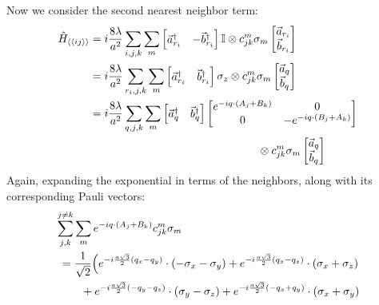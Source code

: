 \documentclass[10pt,a4paper]{article}
\begin{document}
\begin{multicols}{2}
Now we consider the second nearest neighbor term:
\tiny
\begin{align*}
\hat{H}_{\scriptsize\langle\langle ij\rangle\rangle}& = i\frac{8\lambda}{a^2}\sum_{i,j,k}\sum_{m}\begin{bmatrix} \vec{a}_{r_i}^{\dagger} & -\vec{b}_{r_i}^{\dagger} \end{bmatrix}\mathbb{I}\otimes c^m_{jk}\sigma_m \begin{bmatrix} \vec{a}_{r_i} \\ \vec{b}_{r_i}\end{bmatrix}\\
&=  i\frac{8\lambda}{a^2}\sum_{r_i,j,k}\sum_{m}\begin{bmatrix} \vec{a}_{r_i}^{\dagger} & \vec{b}_{r_i}^{\dagger} \end{bmatrix}\sigma_z\otimes c^m_{jk}\sigma_m \begin{bmatrix} \vec{a}_{q} \\ \vec{b}_{q}\end{bmatrix}\\
&=  i\frac{8\lambda}{a^2}\sum_{q,j,k}\sum_{m}\begin{bmatrix} \vec{a}_{q}^{\dagger} & \vec{b}_{q}^{\dagger} \end{bmatrix}\begin{bmatrix} e^{-iq\cdot (A_j+B_k)}&0\\0& -e^{-iq\cdot (B_j+A_k)}\\ \end{bmatrix}\\
&\hspace{5.3cm}\otimes c^m_{jk}\sigma_m \begin{bmatrix} \vec{a}_{q} \\ \vec{b}_{q}\end{bmatrix}\\
\end{align*}\normalsize
Again, expanding the exponential in terms of the neighbors, along with its corresponding Pauli vectors:
\tiny
\begin{align*}
&\sum_{j,k}^{j\neq k}\sum_{m}e^{-iq\cdot (A_j+B_k)}c_{jk}^{m}\sigma_m\\
& \ = \frac{1}{\sqrt{2}} \Big( e^{-i\frac{a\sqrt{3}}{2}(q_x-q_y)}\cdot (-\sigma_x - \sigma_y)+e^{-i\frac{a\sqrt{3}}{2}(q_x-q_z)}\cdot (\sigma_x + \sigma_z)\\
&\hspace{0.8cm} + e^{-i\frac{a\sqrt{3}}{2}(-q_y-q_z)}\cdot (\sigma_y - \sigma_z)+ e^{-i\frac{a\sqrt{3}}{2}(-q_x+q_y)}\cdot (\sigma_x + \sigma_y)\\

\end{align*}
\end{multicols}
\end{document}
